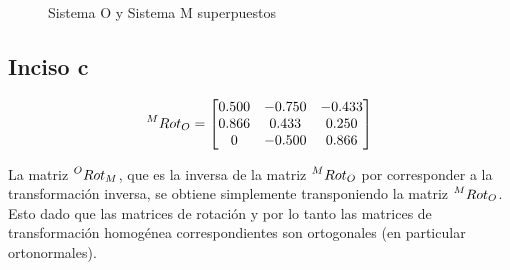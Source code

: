 \documentclass[a4paper,12pt]{article}
\begin{document}
\begin{figure}[H]
    \centering
    \begin{adjustbox}{scale = 0.85, max width=\columnwidth}
    \end{adjustbox}
    \caption{Sistema O y Sistema M superpuestos}
\end{figure}

\subsection{Inciso c}
\begin{equation*}
    \prescript{M}{}{Rot_O} = 
    \begin{bmatrix}
        0.500  &  -0.750  & -0.433 \\
        0.866  &  0.433   & 0.250 \\
        0      & -0.500   & 0.866
    \end{bmatrix}
\end{equation*}

La matriz $\prescript{O}{}{Rot_M}$, que es la inversa de la matriz $\prescript{M}{}{Rot_O}$ por corresponder a la transformación inversa,
se obtiene simplemente transponiendo la matriz $\prescript{M}{}{Rot_O}$. Esto dado que las matrices de rotación y por lo tanto las matrices de 
transformación homogénea correspondientes son ortogonales (en particular ortonormales).
\end{document}
